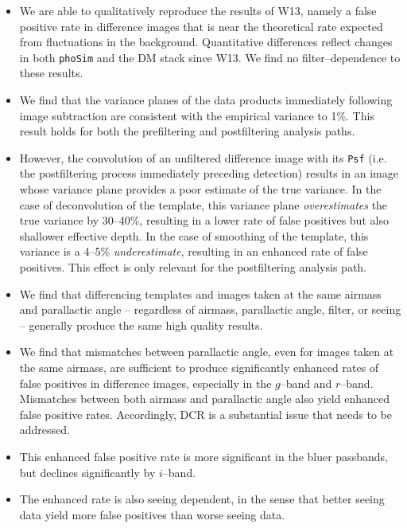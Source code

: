 \documentclass[prd, nofootinbib, floatfix, 11pt, tightenlines, times]{article}
\begin{document}
\begin{itemize}

\item We are able to qualitatively reproduce the results of W13,
  namely a false positive rate in difference images that is near the
  theoretical rate expected from fluctuations in the background.
  Quantitative differences reflect changes in both {\tt phoSim} and
  the DM stack since W13.  We find no filter--dependence to these
  results.

\item We find that the variance planes of the data products
  immediately following image subtraction are consistent with the
  empirical variance to 1\%.  This result holds for both the
  prefiltering and postfiltering analysis paths.

\item However, the convolution of an unfiltered difference image with
  its {\tt Psf} (i.e. the postfiltering process immediately preceding
  detection) results in an image whose variance plane provides a poor
  estimate of the true variance.  In the case of deconvolution of the
  template, this variance plane {\it overestimates} the true variance
  by 30--40\%, resulting in a lower rate of false positives but also
  shallower effective depth.  In the case of smoothing of the
  template, this variance is a 4--5\% {\it underestimate}, resulting
  in an enhanced rate of false positives.  This effect is only
  relevant for the postfiltering analysis path.

\item We find that differencing templates and images taken at the same
  airmass and parallactic angle -- regardless of airmass, parallactic
  angle, filter, or seeing -- generally produce the same high quality
  results.

\item We find that mismatches between parallactic angle, even for
  images taken at the same airmass, are sufficient to produce
  significantly enhanced rates of false positives in difference
  images, especially in the $g$--band and $r$--band.  Mismatches
  between both airmass and parallactic angle also yield enhanced false
  positive rates.  Accordingly, DCR is a substantial issue that needs
  to be addressed.

\item This enhanced false positive rate is more significant in the
  bluer passbands, but declines significantly by $i$--band.

\item The enhanced rate is also seeing dependent, in the sense that
  better seeing data yield more false positives than worse seeing
  data.


\end{itemize}
\end{document}
